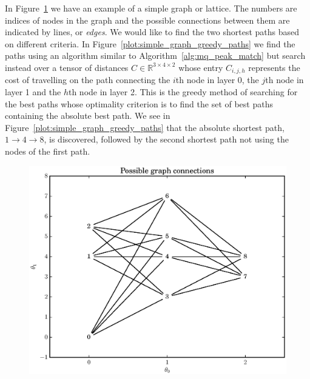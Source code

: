 In Figure~\ref{plot:simple_graph} we have an example of a simple graph or
lattice. The numbers are indices of nodes in the graph and the possible
connections between them are indicated by lines, or \textit{edges}. We would
like to find the two shortest paths based on different criteria. In
Figure~\ref{plot:simple_graph_greedy_paths} we find the paths using an algorithm
similar to Algorithm~\ref{alg:mq_peak_match} but search instead over a tensor of
distances $C \in \mathbb{R}^{3 \times 4 \times 2}$ whose entry $C_{i,j,h}$
represents the cost of travelling on the path connecting the $i$th node in layer
0, the $j$th node in layer 1 and the $h$th node in layer 2. This is the greedy
method of searching for the best paths whose optimality criterion is to find the
set of best paths containing the absolute best path. We see in
Figure~\ref{plot:simple_graph_greedy_paths} that the absolute shortest path, $1
\rightarrow 4 \rightarrow 8$, is discovered, followed by the second shortest
path not using the nodes of the first path.

\begin{figure}[!t]
    \caption{\label{plot:simple_graph}}
    \centering
    \includegraphics[width=\figwidthscale\textwidth]{plots/small_graph_ex.eps}
\end{figure}

